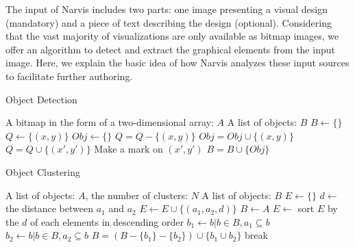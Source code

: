 The input of Narvis includes two parts: one image presenting a visual design (mandatory) and a piece of text describing the design (optional). Considering that the vast majority of visualizations are only available as bitmap images, we offer an algorithm to detect and extract the graphical elements from the input image. Here, we explain the basic idea of how Narvis analyzes these input sources to facilitate further authoring. 
\begin{algorithm} 
        \caption{Object Detection}  
        \label{alg:alg1}
        \begin{algorithmic} %
            \Require A bitmap in the form of a two-dimensional array: $A$
            \Ensure A list of objects: $B$
            \State $B \gets \{\}$
                    \State $Q \gets \{(x,y)\} $
                    \State $Obj \gets \{\}$
                        \State $Q = Q - \{(x,y)\}$
                        \State $Obj = Obj \cup \{(x,y)\}$
                                \State $Q = Q \cup \{(x',y')\}$
                                \State Make a mark on $(x',y')$
                            \EndIf
                        \EndFor
                    \EndFor
                    \State $B = B \cup \{Obj\}$
                \EndIf
            \EndFor
            \State {}
        \end{algorithmic}  
    \end{algorithm} 
    
    
    \begin{algorithm}  
        \caption{Object Clustering} 
        \label{alg:alg2} 
        \begin{algorithmic} %
            \Require A list of objects: $A$, the number of clusters: $N$
            \Ensure A list of objects: $B$
            \State $E \gets \{\}$
                 
                        \State $d \gets$ the distance between $a_1$ and $a_2$
                        \State $E \gets E \cup \{(a_1, a_2, d)\}$
                    \EndIf
                \EndFor
            \EndFor
            \State $B \gets A$
            \State $E \gets$ sort $E$ by the $d$ of each elements in descending order
                \State $b_1 \gets b|b\in B, a_1 \subseteq b$
                \State $b_2 \gets b|b\in B, a_2 \subseteq b$
                    \State $B = (B - \{b_1\} - \{b_2\})\cup \{b_1 \cup b_2\}$
                \EndIf
                    \State break
                \EndIf
            \EndFor
            \State {}
        \end{algorithmic}  
    \end{algorithm} 
    

